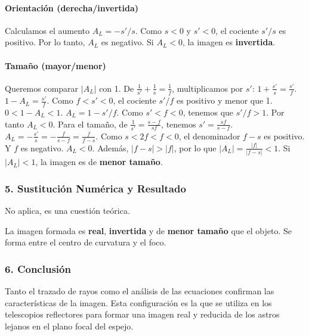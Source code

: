 \paragraph*{Orientación (derecha/invertida)}
Calculamos el aumento $A_L = -s'/s$. Como $s<0$ y $s'<0$, el cociente $s'/s$ es positivo. Por lo tanto, $A_L$ es negativo.
Si $A_L < 0$, la imagen es \textbf{invertida}.

\paragraph*{Tamaño (mayor/menor)}
Queremos comparar $|A_L|$ con 1.
De $\frac{1}{s'} + \frac{1}{s} = \frac{1}{f}$, multiplicamos por $s'$: $1 + \frac{s'}{s} = \frac{s'}{f}$.
$1 - A_L = \frac{s'}{f}$. Como $f < s' < 0$, el cociente $s'/f$ es positivo y menor que 1.
$0 < 1 - A_L < 1$.
$A_L = 1 - s'/f$. Como $s'<f<0$, tenemos que $s'/f > 1$. Por tanto $A_L < 0$.
Para el tamaño, de $\frac{1}{s'} = \frac{s-f}{sf}$, tenemos $s'=\frac{sf}{s-f}$.
$A_L = -\frac{s'}{s} = -\frac{f}{s-f} = \frac{f}{f-s}$.
Como $s < 2f < f < 0$, el denominador $f-s$ es positivo. Y $f$ es negativo. $A_L < 0$.
Además, $|f-s| > |f|$, por lo que $|A_L| = \frac{|f|}{|f-s|} < 1$.
Si $|A_L| < 1$, la imagen es de \textbf{menor tamaño}.

\subsubsection*{5. Sustitución Numérica y Resultado}
No aplica, es una cuestión teórica.
\begin{cajaresultado}
La imagen formada es \textbf{real}, \textbf{invertida} y de \textbf{menor tamaño} que el objeto. Se forma entre el centro de curvatura y el foco.
\end{cajaresultado}

\subsubsection*{6. Conclusión}
\begin{cajaconclusion}
Tanto el trazado de rayos como el análisis de las ecuaciones confirman las características de la imagen. Esta configuración es la que se utiliza en los telescopios reflectores para formar una imagen real y reducida de los astros lejanos en el plano focal del espejo.
\end{cajaconclusion}

\newpage

